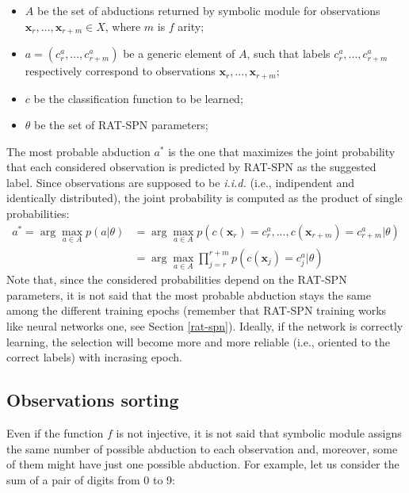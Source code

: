 \begin{itemize}
	\item $\mathit{A}$ be the set of abductions returned by symbolic module for observations $\mathbf{x}_r,...,\mathbf{x}_{r+m} \in \mathit{X}$, where $\mathit{m}$ is $\mathit{f}$ arity;  
	\item $\mathit{a} = (\mathit{c_r^a},...,\mathit{c_{r+m}^a})$ be a generic element of $\mathit{A}$, such that labels $\mathit{c_r^a},...,\mathit{c_{r+m}^a}$ respectively correspond to observations $\mathbf{x}_r,...,\mathbf{x}_{r+m}$;
	\item $c$ be the classification function to be learned;
	\item $\theta$ be the set of RAT-SPN parameters;
\end{itemize}
The most probable abduction $a^*$ is the one that maximizes the joint probability that each considered observation is predicted by RAT-SPN as the suggested label. Since observations are supposed to be \textit{i.i.d.} (i.e., indipendent and identically distributed), the joint probability is computed as the product of single probabilities:
\begin{equation}\begin{split}
	a^* = \arg\max_{a \in \mathit{A}} p(\mathit{a}|\theta) &= \arg\max_{a \in \mathit{A}} p(c(\mathbf{x}_r) = c_r^a,...,c(\mathbf{x}_{r+m}) = c_{r+m}^a|\theta) \\
	&= \arg\max_{a \in \mathit{A}} \prod_{j=r}^{r+m} p(c(\mathbf{x}_j) = c_j^a|\theta)
\end{split}\end{equation}
Note that, since the considered probabilities depend on the RAT-SPN parameters, it is not said that the most probable abduction stays the same among the different training epochs (remember that RAT-SPN training works like neural networks one, see Section \ref{rat-spn}). Ideally, if the network is correctly learning, the selection will become more and more reliable (i.e., oriented to the correct labels) with incrasing epoch.

\subsection{Observations sorting}
\label{sorting}
Even if the function $\mathit{f}$ is not injective, it is not said that symbolic module assigns the same number of possible abduction to each observation and, moreover, some of them might have just one possible abduction. For example, let us consider the sum of a pair of digits from 0 to 9:


